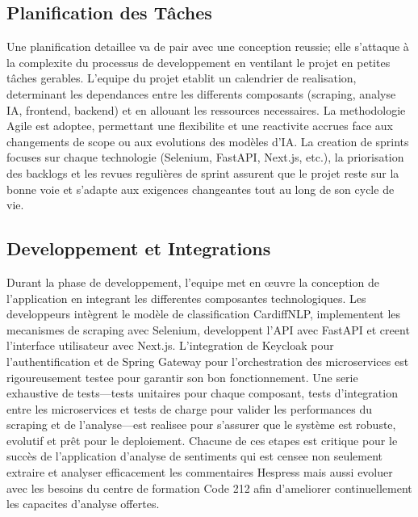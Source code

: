 \subsection{Planification des Tâches}
Une planification detaillee va de pair avec une conception reussie; elle s'attaque à la complexite du processus de developpement en ventilant le projet en petites tâches gerables. L'equipe du projet etablit un calendrier de realisation, determinant les dependances entre les differents composants (scraping, analyse IA, frontend, backend) et en allouant les ressources necessaires. La methodologie Agile est adoptee, permettant une flexibilite et une reactivite accrues face aux changements de scope ou aux evolutions des modèles d'IA. La creation de sprints focuses sur chaque technologie (Selenium, FastAPI, Next.js, etc.), la priorisation des backlogs et les revues regulières de sprint assurent que le projet reste sur la bonne voie et s'adapte aux exigences changeantes tout au long de son cycle de vie.

\subsection{Developpement et Integrations}
Durant la phase de developpement, l'equipe met en œuvre la conception de l'application en integrant les differentes composantes technologiques. Les developpeurs intègrent le modèle de classification CardiffNLP, implementent les mecanismes de scraping avec Selenium, developpent l'API avec FastAPI et creent l'interface utilisateur avec Next.js. L'integration de Keycloak pour l'authentification et de Spring Gateway pour l'orchestration des microservices est rigoureusement testee pour garantir son bon fonctionnement. Une serie exhaustive de tests—tests unitaires pour chaque composant, tests d'integration entre les microservices et tests de charge pour valider les performances du scraping et de l'analyse—est realisee pour s'assurer que le système est robuste, evolutif et prêt pour le deploiement.
Chacune de ces etapes est critique pour le succès de l'application d'analyse de sentiments qui est censee non seulement extraire et analyser efficacement les commentaires Hespress mais aussi evoluer avec les besoins du centre de formation Code 212 afin d'ameliorer continuellement les capacites d'analyse offertes.
